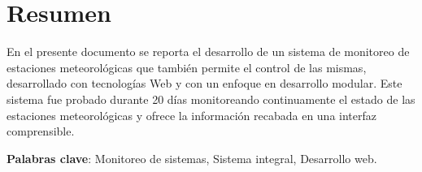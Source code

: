 \chapter*{Resumen}

En el presente documento se reporta el desarrollo de un sistema de monitoreo de estaciones meteorológicas que también permite el control de las mismas, desarrollado con tecnologías Web y con un enfoque en desarrollo modular. Este sistema fue probado durante 20 días monitoreando continuamente el estado de las estaciones meteorológicas y ofrece la información recabada en una interfaz comprensible.

\textbf{Palabras clave}: Monitoreo de sistemas, Sistema integral, Desarrollo web.
